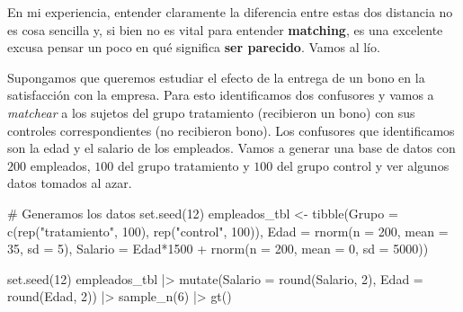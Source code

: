 \documentclass[
  letterpaper,
  DIV=11,
  numbers=noendperiod,
  oneside]{scrreprt}
\newenvironment{Shaded}{\begin{snugshade}}{\end{snugshade}}
\newcommand{\AttributeTok}[1]{\textcolor[rgb]{0.40,0.45,0.13}{#1}}
\newcommand{\CommentTok}[1]{\textcolor[rgb]{0.37,0.37,0.37}{#1}}
\newcommand{\DecValTok}[1]{\textcolor[rgb]{0.68,0.00,0.00}{#1}}
\newcommand{\FunctionTok}[1]{\textcolor[rgb]{0.28,0.35,0.67}{#1}}
\newcommand{\NormalTok}[1]{\textcolor[rgb]{0.00,0.23,0.31}{#1}}
\newcommand{\OtherTok}[1]{\textcolor[rgb]{0.00,0.23,0.31}{#1}}
\newcommand{\SpecialCharTok}[1]{\textcolor[rgb]{0.37,0.37,0.37}{#1}}
\newcommand{\StringTok}[1]{\textcolor[rgb]{0.13,0.47,0.30}{#1}}
\begin{document}
En mi experiencia, entender claramente la diferencia entre estas dos
distancia no es cosa sencilla y, si bien no es vital para entender
\textbf{matching}, es una excelente excusa pensar un poco en qué
significa \textbf{ser parecido}. Vamos al lío.

Supongamos que queremos estudiar el efecto de la entrega de un bono en
la satisfacción con la empresa. Para esto identificamos dos confusores y
vamos a \emph{matchear} a los sujetos del grupo tratamiento (recibieron
un bono) con sus controles correspondientes (no recibieron bono). Los
confusores que identificamos son la edad y el salario de los empleados.
Vamos a generar una base de datos con \(200\) empleados, \(100\) del
grupo tratamiento y \(100\) del grupo control y ver algunos datos
tomados al azar.

\begin{Shaded}
\begin{Highlighting}[]
\CommentTok{\# Generamos los datos}
\FunctionTok{set.seed}\NormalTok{(}\DecValTok{12}\NormalTok{)}
\NormalTok{empleados\_tbl }\OtherTok{\textless{}{-}} \FunctionTok{tibble}\NormalTok{(}\AttributeTok{Grupo =} \FunctionTok{c}\NormalTok{(}\FunctionTok{rep}\NormalTok{(}\StringTok{"tratamiento"}\NormalTok{, }\DecValTok{100}\NormalTok{), }\FunctionTok{rep}\NormalTok{(}\StringTok{"control"}\NormalTok{, }\DecValTok{100}\NormalTok{)),}
                        \AttributeTok{Edad =} \FunctionTok{rnorm}\NormalTok{(}\AttributeTok{n =} \DecValTok{200}\NormalTok{, }\AttributeTok{mean =} \DecValTok{35}\NormalTok{, }\AttributeTok{sd =} \DecValTok{5}\NormalTok{),}
                        \AttributeTok{Salario =}\NormalTok{ Edad}\SpecialCharTok{*}\DecValTok{1500} \SpecialCharTok{+} \FunctionTok{rnorm}\NormalTok{(}\AttributeTok{n =} \DecValTok{200}\NormalTok{, }\AttributeTok{mean =} \DecValTok{0}\NormalTok{, }\AttributeTok{sd =} \DecValTok{5000}\NormalTok{))}

\FunctionTok{set.seed}\NormalTok{(}\DecValTok{12}\NormalTok{)}
\NormalTok{empleados\_tbl }\SpecialCharTok{|\textgreater{}} 
  \FunctionTok{mutate}\NormalTok{(}\AttributeTok{Salario =} \FunctionTok{round}\NormalTok{(Salario, }\DecValTok{2}\NormalTok{),}
         \AttributeTok{Edad =} \FunctionTok{round}\NormalTok{(Edad, }\DecValTok{2}\NormalTok{)) }\SpecialCharTok{|\textgreater{}}
  \FunctionTok{sample\_n}\NormalTok{(}\DecValTok{6}\NormalTok{) }\SpecialCharTok{|\textgreater{}} 
  \FunctionTok{gt}\NormalTok{()}
\end{Highlighting}
\end{Shaded}
\end{document}
